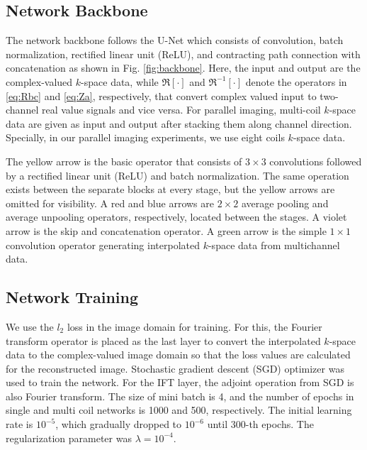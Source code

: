 \documentclass[10pt,journal]{IEEEtran}
\newcommand{\0}{{\boldsymbol{0}}}
\newcommand{\Rbc}{{\mathfrak{R}}}
\begin{document}
\subsection{Network Backbone}

The network backbone  follows the  U-Net\cite{ronneberger2015u} which consists of convolution, batch normalization, rectified linear unit (ReLU), and contracting path connection with concatenation as shown in Fig. \ref{fig:backbone}.
Here, the input and output are the complex-valued $k$-space data, while $\Rbc[\cdot]$ and $\Rbc^{-1}[\cdot]$ denote the operators 
in \eqref{eq:Rbc} and \eqref{eq:Za}, respectively, that convert complex valued input to two-channel real value signals and vice versa.
For parallel imaging, 
multi-coil $k$-space data are given as input and output after stacking them along channel direction. Specially,  in our parallel
imaging experiments, we use eight coils $k$-space data.


The yellow arrow  is the basic operator that consists of $3 \times 3$ convolutions followed by a rectified linear unit (ReLU) and batch normalization.
The same operation exists  between the separate blocks at every stage, but
the yellow arrows are omitted for visibility.
A red and blue arrows are $2 \times 2$ average pooling and average unpooling operators, respectively, located between the stages.
A violet arrow is the skip and concatenation operator. A green arrow is the simple $1 \times 1$ convolution operator generating interpolated $k$-space data from multichannel data.





\subsection{Network Training}

We use the $l_2$ loss  in the image domain  for training. For this, 
the Fourier transform operator is placed as the last layer to convert the interpolated $k$-space data to
the complex-valued image domain so that  the loss values are calculated for the reconstructed image.
Stochastic gradient descent (SGD) optimizer was used to train the network. For the IFT layer, the adjoint operation from SGD is also Fourier transform.
The size of mini batch is 4, and the number of epochs in single and multi coil networks is 1000 and 500, respectively. The initial learning rate is $10^{-5}$, which gradually dropped to $10^{-6}$ until 300-th epochs. The regularization parameter was $\lambda = 10^{-4}$. 
\end{document}

